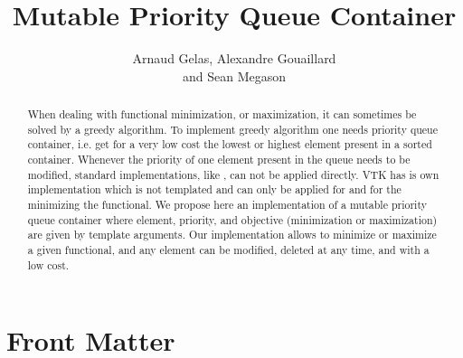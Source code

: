 \documentclass{InsightArticle}
\title{Mutable Priority Queue Container}
\author{Arnaud Gelas, Alexandre Gouaillard\\
and Sean Megason}
\begin{document}
\ifpdf
\else
\fi


\maketitle


\ifhtml
\chapter*{Front Matter\label{front}}
\fi


\begin{abstract}
When dealing with functional minimization, or maximization, it can sometimes be solved by a greedy algorithm. To implement greedy algorithm one needs priority queue container, i.e. get for a very low cost the lowest or highest element present in a sorted container. Whenever the priority of one element present in the queue needs to be modified, standard implementations, like , can not be applied directly. VTK has is own implementation  which is not templated and can only be applied for  and for the minimizing the functional. We propose here an implementation of a mutable priority queue container where element, priority, and objective (minimization or maximization) are given by template arguments. Our implementation allows to minimize or maximize a given functional, and any element can be modified, deleted at any time, and with a low cost.

\end{abstract}
\end{document}
